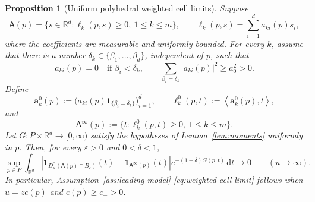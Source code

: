 \documentclass[11pt]{amsart}
\numberwithin{equation}{section}
\newtheorem{proposition}[theorem]{Proposition}
\theoremstyle{definition}
\theoremstyle{remark}
\newcommand{\R}{\mathbb{R}}
\newcommand{\ind}{\mathbf{1}}
\newcommand{\dd}{\,\mathrm{d}}
\newcommand{\eps}{\varepsilon}
\newcommand{\Afib}{\mathsf{A}}
\newcommand{\inner}[2]{\left\langle #1,#2\right\rangle}
\begin{document}
\begin{proposition}[Uniform polyhedral weighted cell limits]
\label{prop:polyhedral-cone-limit}
Suppose
\[
 \Afib(p)=\{s\in\R^d:\ell_k(p,s)\ge0,\ 1\le k\le m\},
 \qquad
 \ell_k(p,s)=\sum_{i=1}^d a_{ki}(p)s_i,
\]
where the coefficients are measurable and uniformly bounded.  For every $k$,
assume that there is a number $\delta_k\in\{\beta_1,\ldots,\beta_d\}$,
independent of $p$, such that
\begin{equation}\label{eq:polyhedral-leading-coefficients}
 a_{ki}(p)=0\quad\text{if }\beta_i<\delta_k,
 \qquad
 \sum_{\beta_i=\delta_k}|a_{ki}(p)|^2\ge a_0^2>0.
\end{equation}
Define
\[
 \bm a_k^0(p):=
 \bigl(a_{ki}(p)\ind_{\{\beta_i=\delta_k\}}\bigr)_{i=1}^d,
 \qquad
 \ell_k^0(p,t):=\inner{\bm a_k^0(p)}{t},
\]
and
\[
 \Afib^\infty(p):=\{t:\ell_k^0(p,t)\ge0,\ 1\le k\le m\}.
\]
Let $G:P\times\R^d\to[0,\infty)$ satisfy the hypotheses of
Lemma~\ref{lem:moments} uniformly in $p$.  Then, for every $\eps>0$ and
$0<\delta<1$,
\begin{equation}\label{eq:polyhedral-convergence}
 \sup_{p\in P}\int_{\R^d}
 \left|\ind_{D_u^{\bm\beta}(\Afib(p)\cap B_\eps)}(t)
       -\ind_{\Afib^\infty(p)}(t)\right|
 e^{-(1-\delta)G(p,t)}\dd t\longrightarrow0
 \qquad(u\to\infty).
\end{equation}
In particular, Assumption~\ref{ass:leading-model}
\eqref{eq:weighted-cell-limit} follows when $u=zc(p)$ and $c(p)\ge c_->0$.
\end{proposition}
\end{document}
